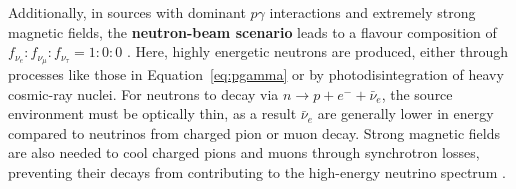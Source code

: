 Additionally, in sources with dominant $p\gamma$ interactions and extremely strong magnetic fields, the \textbf{neutron-beam scenario} leads to a flavour composition of $f_{\nu_e} : f_{\nu_\mu} : f_{\nu_\tau} = 1 : 0 : 0$ \cite{flavour1}. Here, highly energetic neutrons are produced, either through processes like those in Equation~\ref{eq:pgamma} or by photodisintegration of heavy cosmic-ray nuclei. For neutrons to decay via $n \rightarrow p + e^- + \bar{\nu}_e$, the source environment must be optically thin, as a result $\bar{\nu}_e$ are generally lower in energy compared to neutrinos from charged pion or muon decay. Strong magnetic fields are also needed to cool charged pions and muons through synchrotron losses, preventing their decays from contributing to the high-energy neutrino spectrum .

